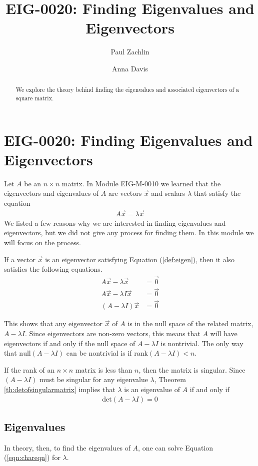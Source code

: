 \documentclass{ximera}
\author{Paul Zachlin \and Anna Davis} \title{EIG-0020: Finding Eigenvalues and Eigenvectors} \license{CC-BY 4.0}
\begin{document}
\begin{abstract}
We explore the theory behind finding the eigenvalues and associated eigenvectors of a square matrix.  
\end{abstract}
\maketitle
\section*{EIG-0020: Finding Eigenvalues and Eigenvectors}
Let $A$ be an $n \times n$ matrix.  In Module EIG-M-0010 we learned that the eigenvectors and eigenvalues of $A$ are vectors $\vec{x}$ and scalars $\lambda$ that satisfy the equation 
\begin{align}\label{def:eigen} A \vec{x} = \lambda \vec{x}\end{align}
We listed a few reasons why we are interested in finding eigenvalues and eigenvectors, but we did not give any process for finding them.  In this module we will focus on the process.

If a vector $\vec{x}$ is an eigenvector satisfying Equation (\ref{def:eigen}), then it also satisfies the following equations.
\begin{align*}
A\vec{x}-\lambda \vec{x} &= \vec{0} \\
A\vec{x}-\lambda I\vec{x} &= \vec{0} \\
(A-\lambda I)\vec{x} &= \vec{0}
\end{align*}

This shows that any eigenvector $\vec{x}$ of $A$ is in the null space of the related matrix, $A-\lambda I$.  Since eigenvectors are non-zero vectors, this means that $A$ will have eigenvectors if and only if the null space of $A-\lambda I$ is nontrivial.  The only way that $\mbox{null}(A-\lambda I)$ can be nontrivial is if $\mbox{rank}(A-\lambda I)<n$.

If the rank of an $n \times n$ matrix is less than $n$, then the matrix is singular.  Since $(A-\lambda I)$ must be singular for any eigenvalue $\lambda$, Theorem \ref{th:detofsingularmatrix} implies that $\lambda$ is an eigenvalue of $A$ if and only if \begin{align}\label{eqn:chareqn}\mbox{det}(A-\lambda I) = 0\end{align}

\subsection{Eigenvalues}
In theory, then, to find the eigenvalues of $A$, one can solve Equation (\ref{eqn:chareqn}) for $\lambda$.  
\end{document}
